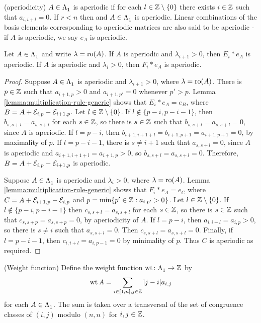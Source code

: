 \documentclass[a4paper, 11pt]{report}
\begin{document}
\begin{definition}(aperiodicity)\label{def:aperiodic}
$A\in\Lambda_1^{}$ is aperiodic if for each $l\in\mathbb{Z}\setminus\{0\}$ there exists $i\in\mathbb{Z}$ such that $a_{i,i+l}=0$. If $r<n$ then and $A\in\Lambda_1^{}$ is aperiodic. Linear combinations of the basis elements corresponding to aperiodic matrices are also said to be aperiodic - if $A$ is aperiodic, we say $e_A$ is aperiodic.
\end{definition}

\begin{lemma}\label{lemma:words-are-aperiodic}
Let $A\in\Lambda_1^{}$ and write $\lambda=\operatorname{ro}(A)$. If $A$ is aperiodic and $\lambda_{i+1}>0$, then $E_i\ast e_A$ is aperiodic. If $A$ is aperiodic and $\lambda_i>0$, then $F_i\ast e_A$ is aperiodic.
\end{lemma}

\begin{proof}
Suppose $A\in\Lambda_1^{}$ is aperiodic and $\lambda_{i+1}>0$, where $\lambda=\operatorname{ro}(A)$. There is $p\in\mathbb{Z}$ such that $a_{i+1,p}>0$ and $a_{i+1,p'}=0$ whenever $p'>p$. Lemma \ref{lemma:multiplication-rule-generic} shows that $E_i\ast e_A = e_B$, where $B=A+\mathcal{E}_{i,p}-\mathcal{E}_{i+1,p}$. Let $l\in\mathbb{Z}\setminus\{0\}$. If $l\notin\{p-i,p-i-1\}$, then $b_{s,s+l}=a_{s,s+l}$ for each $s\in\mathbb{Z}$, so there is $s\in\mathbb{Z}$ such that $b_{s,s+l}=a_{s,s+l}=0$, since $A$ is aperiodic. If $l=p-i$, then $b_{i+1,i+1+l} = b_{i+1,p+1}=a_{i+1,p+1}=0$, by maximality of $p$. If $l=p-i-1$, there is $s\neq i+1$ such that $a_{s,s+l}=0$, since $A$ is aperiodic and $a_{i+1,i+1+l}=a_{i+1,p}>0$, so $b_{s,s+l}=a_{s,s+l}=0$. Therefore, $B=A+\mathcal{E}_{i,p}-\mathcal{E}_{i+1,p}$ is aperiodic.

Suppose $A\in\Lambda_1^{}$ is aperiodic and $\lambda_i>0$, where $\lambda=\operatorname{ro}(A)$. Lemma \ref{lemma:multiplication-rule-generic} shows that $F_i\ast e_A = e_C$ where $C=A+\mathcal{E}_{i+1,p}-\mathcal{E}_{i,p}$ and $p=\min\{p'\in\mathbb{Z}: a_{i,p'}>0\}$. Let $l\in\mathbb{Z}\setminus\{0\}$. If $l\notin\{p-i,p-i-1\}$ then $c_{s,s+l}=a_{s,s+l}$ for each $s\in\mathbb{Z}$, so there is $s\in\mathbb{Z}$ such that $c_{s,s+p}=a_{s,s+p}=0$, by aperiodicity of $A$. If $l=p-i$, then $a_{i,i+l}=a_{i,p}>0$, so there is $s\neq i$ such that $a_{s,s+l}=0$. Then $c_{s,s+l}=a_{s,s+l}=0$. Finally, if $l=p-i-1$, then $c_{i,i+l}=a_{i,p-1}=0$ by minimality of $p$. Thus $C$ is aperiodic as required.
\end{proof}

\begin{definition}(Weight function)\label{def:weight-function}
Define the weight function $\operatorname{wt}\colon\Lambda_1^{}\to\mathbb{Z}$ by
\begin{equation*}
\operatorname{wt}{A} = \sum_{i\in[1,n],j\in\mathbb{Z}} |j-i|a_{i,j}
\end{equation*}
for each $A\in\Lambda_1^{}$. The sum is taken over a transversal of the set of congruence classes of $(i,j)$ modulo $(n,n)$ for $i,j\in\mathbb{Z}$.
\end{definition}
\end{document}
